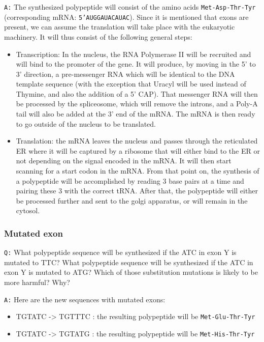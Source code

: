 \documentclass[11pt, a4paper,titlepage]{article}
\begin{document}
\texttt{A:} The synthesized polypeptide will consist of the amino acids
\texttt{Met-Asp-Thr-Tyr} (corresponding mRNA: \texttt{5'AUGGAUACAUAC}). Since it is
mentioned that exons are present, we can assume the translation will
take place with the eukaryotic machinery. It will thus consist of the
following general steps:

\begin{itemize}
\item Transcription: In the nucleus, the RNA Polymerase II will be
  recruited and will bind to the promoter of the gene. It will
  produce, by moving in the 5' to 3' direction, a pre-messenger RNA
  which will be identical to the DNA template sequence (with the
  exception that Uracyl will be used instead of Thymine, and also the
  addition of a 5' CAP). That messenger RNA will then be processed by
  the spliceosome, which will remove the introns, and a Poly-A tail
  will also be added at the 3' end of the mRNA. The mRNA is then
  ready to go outside of the nucleus to be translated.
\item Translation: the mRNA leaves the nucleus and passes through the
  reticulated ER where it will be captured by a ribosome that will
  either bind to the ER or not depending on the signal encoded in the
  mRNA. It will then start scanning for a start codon in the
  mRNA. From that point on, the synthesis of a polypeptide will be
  accomplished by reading 3 base pairs at a time and pairing these 3
  with the correct tRNA. After that, the polypeptide will either be
  processed further and sent to the golgi apparatus, or will remain in
  the cytosol.
\end{itemize}
\subsubsection{Mutated exon}
\label{sec-1-2-3}

\texttt{Q:} What polypeptide sequence will be synthesized if the ATC in exon
Y is mutated to TTC? What polypeptide sequence will be synthesized if
the ATC in exon Y is mutated to ATG? Which of those substitution
mutations is likely to be more harmful? Why?

\texttt{A:} Here are the new sequences with mutated exons:

\begin{itemize}
\item TGTATC -> TGTTTC : the resulting polypeptide will be \texttt{Met-Glu-Thr-Tyr}
\item TGTATC -> TGTATG : the resulting polypeptide will be \texttt{Met-His-Thr-Tyr}
\end{itemize}
\end{document}
